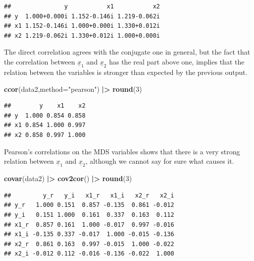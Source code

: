 \documentclass[
]{book}
\newenvironment{Shaded}{\begin{snugshade}}{\end{snugshade}}
\newcommand{\DataTypeTok}[1]{\textcolor[rgb]{0.13,0.29,0.53}{#1}}
\newcommand{\DecValTok}[1]{\textcolor[rgb]{0.00,0.00,0.81}{#1}}
\newcommand{\ErrorTok}[1]{\textcolor[rgb]{0.64,0.00,0.00}{\textbf{#1}}}
\newcommand{\KeywordTok}[1]{\textcolor[rgb]{0.13,0.29,0.53}{\textbf{#1}}}
\newcommand{\NormalTok}[1]{#1}
\newcommand{\OperatorTok}[1]{\textcolor[rgb]{0.81,0.36,0.00}{\textbf{#1}}}
\newcommand{\StringTok}[1]{\textcolor[rgb]{0.31,0.60,0.02}{#1}}
\begin{document}
\begin{verbatim}
##               y           x1           x2
## y  1.000+0.000i 1.152-0.146i 1.219-0.062i
## x1 1.152-0.146i 1.000+0.000i 1.330+0.012i
## x2 1.219-0.062i 1.330+0.012i 1.000+0.000i
\end{verbatim}

The direct correlation agrees with the conjugate one in general, but the fact that the correlation between \(\underline{x}_{1}\) and \(\underline{x}_{2}\) has the real part above one, implies that the relation between the variables is stronger than expected by the previous output.

\begin{Shaded}
\begin{Highlighting}[]
\KeywordTok{ccor}\NormalTok{(data2,}\DataTypeTok{method=}\StringTok{"pearson"}\NormalTok{) }\OperatorTok{|}\ErrorTok{\textgreater{}}\StringTok{ }\KeywordTok{round}\NormalTok{(}\DecValTok{3}\NormalTok{)}
\end{Highlighting}
\end{Shaded}

\begin{verbatim}
##        y    x1    x2
## y  1.000 0.854 0.858
## x1 0.854 1.000 0.997
## x2 0.858 0.997 1.000
\end{verbatim}

Pearson's correlations on the MDS variables shows that there is a very strong relation between \(\underline{x}_{1}\) and \(\underline{x}_{2}\), although we cannot say for sure what causes it.

\begin{Shaded}
\begin{Highlighting}[]
\KeywordTok{covar}\NormalTok{(data2) }\OperatorTok{|}\ErrorTok{\textgreater{}}\StringTok{ }\KeywordTok{cov2cor}\NormalTok{() }\OperatorTok{|}\ErrorTok{\textgreater{}}\StringTok{ }\KeywordTok{round}\NormalTok{(}\DecValTok{3}\NormalTok{)}
\end{Highlighting}
\end{Shaded}

\begin{verbatim}
##         y_r   y_i   x1_r   x1_i   x2_r   x2_i
## y_r   1.000 0.151  0.857 -0.135  0.861 -0.012
## y_i   0.151 1.000  0.161  0.337  0.163  0.112
## x1_r  0.857 0.161  1.000 -0.017  0.997 -0.016
## x1_i -0.135 0.337 -0.017  1.000 -0.015 -0.136
## x2_r  0.861 0.163  0.997 -0.015  1.000 -0.022
## x2_i -0.012 0.112 -0.016 -0.136 -0.022  1.000
\end{verbatim}
\end{document}
